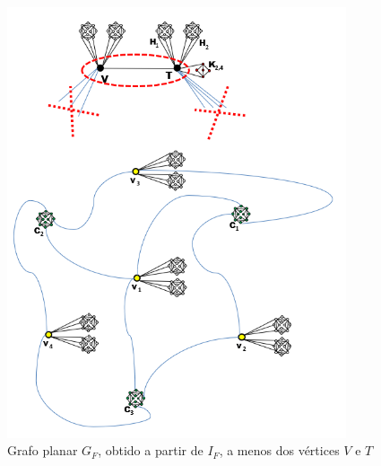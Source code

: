 \begin{figure}[htb]	
\center%
\includegraphics[width=10cm]{./img/grafoIncidenciaCompleto.png}
\caption{Grafo planar $G_F$, obtido a partir de $I_F$, a menos dos vértices $V$ e $T$ }
\label{fig:grafoIncidenciaCompleto}
\end{figure}